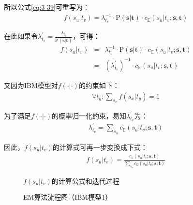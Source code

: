 \noindent \hspace{2em} 所以公式\ref {eq:3-39}可重写为：
\begin{eqnarray}
f(s_u|t_v)=\lambda_{t_v}^{-1} \cdot \textrm{P}(\mathbf{s}| \mathbf{t}) \cdot c_{\mathbb{E}}(s_u|t_v;\mathbf{s},\mathbf{t})
\label{eq:3-41}
\end{eqnarray}

\noindent \hspace{2em} 在此如果令$\lambda_{t_v}^{'}=\frac{\lambda_{t_v}}{\textrm{P}(\mathbf{s}| \mathbf{t})}$，可得：
\begin{eqnarray}
f(s_u|t_v) &= &\lambda_{t_v}^{-1} \cdot \textrm{P}(\mathbf{s}| \mathbf{t}) \cdot c_{\mathbb{E}}(s_u|t_v;\mathbf{s},\mathbf{t}) \nonumber \\
 &=&{(\lambda_{t_v}^{'})}^{-1} \cdot c_{\mathbb{E}}(s_u|t_v;\mathbf{s},\mathbf{t})
\label{eq:3-42}
\end{eqnarray}

\noindent \hspace{2em} 又因为IBM模型对$f(\cdot|\cdot)$的约束如下：
\begin{eqnarray}
\forall t_y : \sum\limits_{s_x} f(s_x|t_y) =1
\label{eq:3-43}
\end{eqnarray}

\noindent \hspace{2em} 为了满足$f(\cdot|\cdot)$的概率归一化约束，易知$\lambda_{t_v}^{'}$为：
\begin{eqnarray}
\lambda_{t_v}^{'}=\sum\limits_{s_u} c_{\mathbb{E}}(s_u|t_v;\mathbf{s},\mathbf{t})
\label{eq:3-44}
\end{eqnarray}

\noindent \hspace{2em} 因此，$f(s_u|t_v)$的计算式可再一步变换成下式：
\begin{eqnarray}
f(s_u|t_v)=\frac{c_{\mathbb{E}}(s_u|t_v;\mathbf{s},\mathbf{t})}  { \sum\limits_{s_u} c_{\mathbb{E}}(s_u|t_v;\mathbf{s},\mathbf{t}) }
\label{eq:3-45}
\end{eqnarray}

\vspace{-0.5em}
\begin{figure}[htp]
    \centering

   \caption{$f(s_u|t_v)$的计算公式和迭代过程}
   \label{fig:3-27}
\end{figure}
\vspace{-1em}
\begin{figure}[htp]
    \centering
    
   \caption{EM算法流程图（IBM模型1）}
   \label{fig:3-28}
\end{figure}

